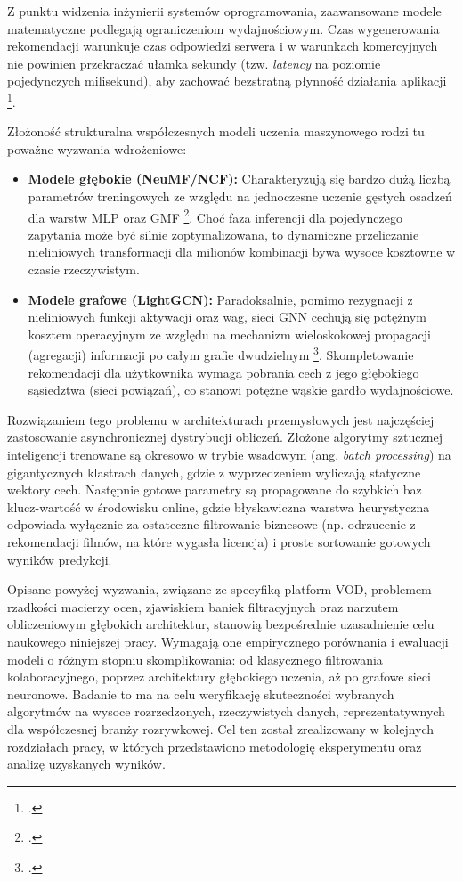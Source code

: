 Z punktu widzenia inżynierii systemów oprogramowania, zaawansowane modele matematyczne podlegają ograniczeniom wydajnościowym. Czas wygenerowania rekomendacji warunkuje czas odpowiedzi serwera i w warunkach komercyjnych nie powinien przekraczać ułamka sekundy (tzw. \textit{latency} na poziomie pojedynczych milisekund), aby zachować bezstratną płynność działania aplikacji \footcite{malinowskiAlgorytmRekomendacjiBazujacy2022}.

Złożoność strukturalna współczesnych modeli uczenia maszynowego rodzi tu poważne wyzwania wdrożeniowe:
\begin{itemize}
    \item \textbf{Modele głębokie (NeuMF/NCF):} Charakteryzują się bardzo dużą liczbą parametrów treningowych ze względu na jednoczesne uczenie gęstych osadzeń dla warstw MLP oraz GMF \footcite{heNeuralCollaborativeFilteringKwiecien032017}. Choć faza inferencji dla pojedynczego zapytania może być silnie zoptymalizowana, to dynamiczne przeliczanie nieliniowych transformacji dla milionów kombinacji bywa wysoce kosztowne w czasie rzeczywistym.
    \item \textbf{Modele grafowe (LightGCN):} Paradoksalnie, pomimo rezygnacji z nieliniowych funkcji aktywacji oraz wag, sieci GNN cechują się potężnym kosztem operacyjnym ze względu na mechanizm wieloskokowej propagacji (agregacji) informacji po całym grafie dwudzielnym \footcite{heLightGCNSimplifyingPowering2020}. Skompletowanie rekomendacji dla użytkownika wymaga pobrania cech z jego głębokiego sąsiedztwa (sieci powiązań), co stanowi potężne wąskie gardło wydajnościowe.
\end{itemize}

Rozwiązaniem tego problemu w architekturach przemysłowych jest najczęściej zastosowanie asynchronicznej dystrybucji obliczeń. Złożone algorytmy sztucznej inteligencji trenowane są okresowo w trybie wsadowym (ang. \textit{batch processing}) na gigantycznych klastrach danych, gdzie z wyprzedzeniem wyliczają statyczne wektory cech. Następnie gotowe parametry są propagowane do szybkich baz klucz-wartość w środowisku online, gdzie błyskawiczna warstwa heurystyczna odpowiada wyłącznie za ostateczne filtrowanie biznesowe (np. odrzucenie z rekomendacji filmów, na które wygasła licencja) i proste sortowanie gotowych wyników predykcji.

Opisane powyżej wyzwania, związane ze specyfiką platform VOD, problemem rzadkości macierzy ocen, zjawiskiem baniek filtracyjnych oraz narzutem obliczeniowym głębokich architektur, stanowią bezpośrednie uzasadnienie celu naukowego niniejszej pracy. Wymagają one empirycznego porównania i ewaluacji modeli o różnym stopniu skomplikowania: od klasycznego filtrowania kolaboracyjnego, poprzez architektury głębokiego uczenia, aż po grafowe sieci neuronowe. Badanie to ma na celu weryfikację skuteczności wybranych algorytmów na wysoce rozrzedzonych, rzeczywistych danych, reprezentatywnych dla współczesnej branży rozrywkowej. Cel ten został zrealizowany w kolejnych rozdziałach pracy, w których przedstawiono metodologię eksperymentu oraz analizę uzyskanych wyników.